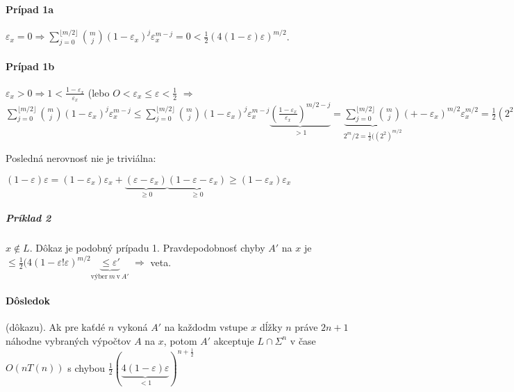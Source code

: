 \documentclass{article}
\begin{document}
\paragraph{Prípad 1a} $\varepsilon_x = 0 \Rightarrow \sum_{j=0}^{\lfloor m/2
\rfloor} \binom{m}{j}(1-\varepsilon_x)^j\varepsilon_x^{m-j} = 0 <
\frac{1}{2}(4(1-\varepsilon)\varepsilon)^{m/2}$.

\paragraph{Prípad 1b} $\varepsilon_x > 0 \Rightarrow 1 <
\frac{1-\varepsilon_x}{\varepsilon_x}$ (lebo $O<\varepsilon_x \leq \varepsilon
<\frac{1}{2}$ $\Rightarrow$ $\sum_{j=0}^{\lfloor m/2 \rfloor}
\binom{m}{j}(1-\varepsilon_x)^j\varepsilon_x^{m-j} \leq \sum_{j=0}^{\lfloor m/2
\rfloor}\binom{m}{j}(1-\varepsilon_x)^j\varepsilon_x^{m-j}\underbrace{\left(\frac{1-\varepsilon_x}{\varepsilon_x}\right)^{m/2
- j}}_{>1} = 
\underbrace{\sum_{j=0}^{\lfloor m/2 \rfloor}\binom{m}{j}}_{2^m/2 =
\frac{1}{2}((2^2)^{m/2}}(+-\varepsilon_x)^{m/2}\varepsilon_x^{m/2} =
\frac{1}{2}(2^2(1-\varepsilon_x)\varepsilon_x)^{m/2} \leq
\frac{1}{2}(4(1-\varepsilon)\varepsilon)^{m/2}$

Posledná nerovnosť nie je triviálna:

$(1-\varepsilon) \varepsilon = (1-\varepsilon_x)\varepsilon_x + 
\underbrace{(\varepsilon - \varepsilon_x)}_{\geq 0}
\underbrace{(1-\varepsilon - \varepsilon_x)}_{\geq 0} \geq
(1-\varepsilon_x) \varepsilon_x$

\subparagraph{Príklad 2} $x \notin L$. Dôkaz je podobný prípadu 1.
Pravdepodobnosť chyby $A'$ na $x$ je $\leq
\frac{1}{2}(4(1-\varepsilon!\varepsilon)^{m/2} \underbrace{\leq
\varepsilon'}_{\mbox{výber}~m~\mbox{v}~A'}$ $\Rightarrow$ veta.

\paragraph{Dôsledok} (dôkazu). Ak pre kaťdé $n$ vykoná $A'$ na každodm vstupe
$x$ dĺžky $n$ práve $2n+1$ náhodne vybraných výpočtov $A$ na $x$, potom $A'$
akceptuje $L \cap \Sigma^n$ v čase $O(nT(n))$ s chybou 
$\frac{1}{2}(\underbrace{4(1-\varepsilon)\varepsilon}_{<1})^{n+\frac{1}{2}}$
\end{document}
